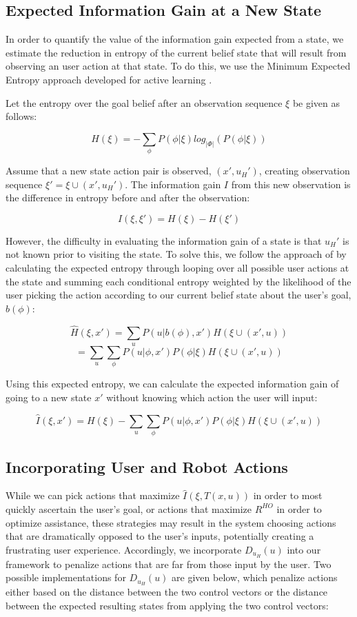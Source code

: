 \documentclass[conference]{IEEEtran}
\begin{document}
\subsection{Expected Information Gain at a New State}

In order to quantify the value of the information gain expected from a state, we estimate the reduction in entropy of the current belief state that will result from observing an user action at that state. To do this, we use the Minimum Expected Entropy approach developed for active learning \cite{holub2008entropy}.

Let the entropy over the goal belief after an observation sequence $\xi$ be given as follows:

\[
H(\xi) = -\sum_\phi P(\phi|\xi)log_{|\Phi|}(P(\phi|\xi))
\]

Assume that a new state action pair is observed, $(x',u_H')$, creating observation sequence $\xi' = \xi \cup (x', u_H')$. The information gain $I$ from this new observation is the difference in entropy before and after the observation:

\[
I(\xi, \xi') = H(\xi) - H(\xi')
\]

However, the difficulty in evaluating the information gain of a state is that $u_H'$ is not known prior to visiting the state. To solve this, we follow the approach of \citet{holub2008entropy} by calculating the expected entropy through looping over all possible user actions at the state and summing each conditional entropy weighted by the likelihood of the user picking the action according to our current belief state about the user's goal, $b(\phi)$:

\[
\hat{H}(\xi, x') = \sum_u P(u|b(\phi),x')H(\xi \cup (x', u))
\]
\[
= \sum_u \sum_\phi P(u|\phi,x')P(\phi|\xi)H(\xi \cup (x', u))
\]

Using this expected entropy, we can calculate the expected information gain of going to a new state $x'$ without knowing which action the user will input:

\[
\hat{I}(\xi, x') = H(\xi) - \sum_u \sum_\phi P(u|\phi,x')P(\phi|\xi)H(\xi \cup (x', u))
\]

\subsection{Incorporating User and Robot Actions}
While we can pick actions that maximize $\hat{I}(\xi, T(x,u))$ in order to most quickly ascertain the user's goal, or actions that maximize $R^{HO}$ in order to optimize assistance, these strategies may result in the system choosing actions that are dramatically opposed to the user's inputs, potentially creating a frustrating user experience. Accordingly, we incorporate $D_{u_H}(u)$ into our framework to penalize actions that are far from those input by the user. Two possible implementations for $D_{u_H}(u)$ are given below, which penalize actions either based on the distance between the two control vectors or the distance between the expected resulting states from applying the two control vectors:
\end{document}
